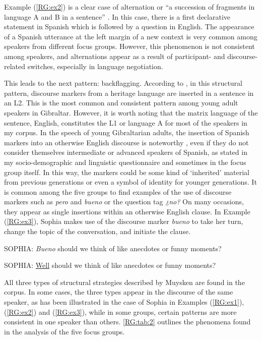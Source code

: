\documentclass[output=paper]{langscibook}
\begin{document}
Example (\ref{RG:ex2}) is a clear case of alternation or “a succession of fragments in language A and B in a sentence” \citep[713]{muysken_language_2013}. In this case, there is a first declarative statement in Spanish which is followed by a question in English. The appearance of a Spanish utterance at the left margin of a new context is very common among speakers from different focus groups. However, this phenomenon is not consistent among speakers, and alternations appear as a result of participant- and discourse-related switches, especially in language negotiation. 

This leads to the next pattern: backflagging. According to \citet[713]{muysken_language_2013}, in this structural pattern, discourse markers from a heritage language are inserted in a sentence in an L2. This is the most common and consistent pattern among young adult speakers in Gibraltar. However, it is worth noting that the matrix language of the sentence, English, constitutes the L1 or language A for most of the speakers in my corpus. In the speech of young Gibraltarian adults, the insertion of Spanish markers into an otherwise English discourse is noteworthy \citep{goria_functional_2017}, even if they do not consider themselves intermediate or advanced speakers of Spanish, as stated in my socio-demographic and linguistic questionnaire and sometimes in the focus group itself. In this way, the markers could be some kind of ‘inherited’ material from previous generations or even a symbol of identity for younger generations. It is common among the five groups to find examples of the use of discourse markers such as \textit{pero} and \textit{bueno} or the question tag \textit{¿no?} On many occasions, they appear as single insertions within an otherwise English clause. In Example (\ref{RG:ex3}), Sophia makes use of the discourse marker \textit{bueno} to take her turn, change the topic of the conversation, and initiate the clause.

\begin{exe}\ex\label{RG:ex3}
SOPHIA: \textit{Bueno} should we think of like anecdotes or funny moments?

SOPHIA: \ul{Well} should we think of like anecdotes or funny moments?
\end{exe}

All three types of structural strategies described by Muysken are found in the corpus. In some cases, the three types appear in the discourse of the same speaker, as has been illustrated in the case of Sophia in Examples (\ref{RG:ex1}), (\ref{RG:ex2}) and (\ref{RG:ex3}), while in some groups, certain patterns are more consistent in one speaker than others. \autoref{RG:tab:2} outlines the phenomena found in the analysis of the five focus groups.
\end{document}
